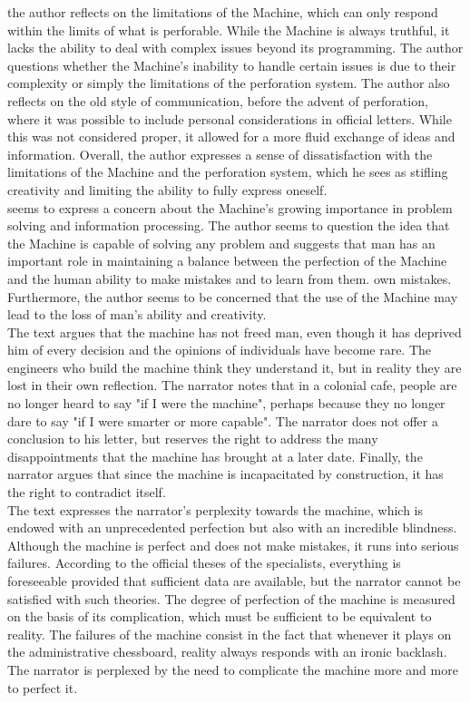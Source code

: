 \documentclass{homework}
\begin{document}
the author reflects on the limitations of the Machine, which can only respond within 
the limits of what is perforable. While the Machine is always truthful, it lacks 
the ability to deal with complex issues beyond its programming. The author questions 
whether the Machine's inability to handle certain issues is due to their complexity 
or simply the limitations of the perforation system.
The author also reflects on the old style of communication, before the advent of 
perforation, where it was possible to include personal considerations in official 
letters. While this was not considered proper, it allowed for a more fluid exchange 
of ideas and information.
Overall, the author expresses a sense of dissatisfaction with the limitations of
the Machine and the perforation system, which he sees as stifling creativity and 
limiting the ability to fully express oneself. \\

seems to express a concern about the Machine's growing importance in problem 
solving and information processing. The author seems to question the idea that 
the Machine is capable of solving any problem and suggests that man has an 
important role in maintaining a balance between the perfection of the Machine 
and the human ability to make mistakes and to learn from them. own mistakes. 
Furthermore, the author seems to be concerned that the use of the Machine may 
lead to the loss of man's ability and creativity. \\

The text argues that the machine has not freed man, even though it has 
deprived him of every decision and the opinions of individuals have become rare. 
The engineers who build the machine think they understand it, but in reality 
they are lost in their own reflection. The narrator notes that in a colonial cafe,
people are no longer heard to say "if I were the machine", perhaps because they no
longer dare to say "if I were smarter or more capable". The narrator does not offer 
a conclusion to his letter, but reserves the right to address the many disappointments 
that the machine has brought at a later date. Finally, the narrator argues that 
since the machine is incapacitated by construction, it has the right to contradict 
itself. \\

The text expresses the narrator's perplexity towards the machine, which is 
endowed with an unprecedented perfection but also with an incredible blindness. 
Although the machine is perfect and does not make mistakes, it runs into serious 
failures. According to the official theses of the specialists, everything is 
foreseeable provided that sufficient data are available, but the narrator cannot 
be satisfied with such theories. The degree of perfection of the machine is 
measured on the basis of its complication, which must be sufficient to be 
equivalent to reality. The failures of the machine consist in the fact that 
whenever it plays on the administrative chessboard, reality always responds 
with an ironic backlash. The narrator is perplexed by the need to complicate 
the machine more and more to perfect it. \\
\end{document}
